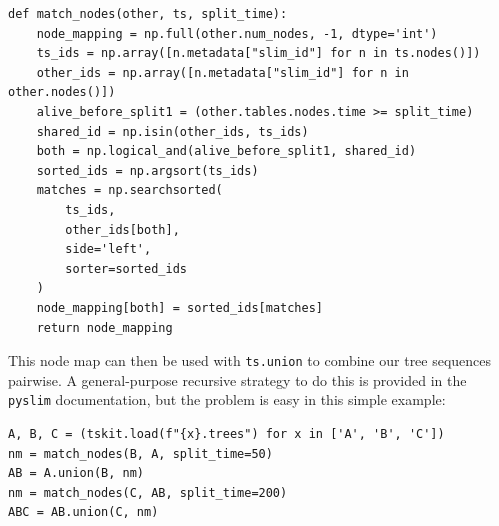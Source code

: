 \documentclass[12pt]{article}
\newcommand{\pyslim}[0]{\texttt{pyslim}\xspace}
\begin{document}
\begin{verbatim}
def match_nodes(other, ts, split_time):
    node_mapping = np.full(other.num_nodes, -1, dtype='int')
    ts_ids = np.array([n.metadata["slim_id"] for n in ts.nodes()])
    other_ids = np.array([n.metadata["slim_id"] for n in other.nodes()])
    alive_before_split1 = (other.tables.nodes.time >= split_time)
    shared_id = np.isin(other_ids, ts_ids)
    both = np.logical_and(alive_before_split1, shared_id)
    sorted_ids = np.argsort(ts_ids)
    matches = np.searchsorted(
        ts_ids,
        other_ids[both],
        side='left',
        sorter=sorted_ids
    )
    node_mapping[both] = sorted_ids[matches]
    return node_mapping
\end{verbatim}
This node map can then be used with \verb|ts.union| to combine our tree sequences pairwise.
A general-purpose recursive strategy to do this is provided in the \pyslim documentation,
but the problem is easy in this simple example:
\begin{verbatim}
A, B, C = (tskit.load(f"{x}.trees") for x in ['A', 'B', 'C'])
nm = match_nodes(B, A, split_time=50)
AB = A.union(B, nm)
nm = match_nodes(C, AB, split_time=200)
ABC = AB.union(C, nm)
\end{verbatim}
% 
% 
\end{document}
